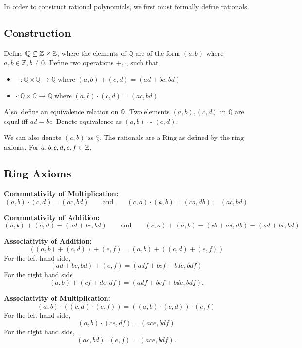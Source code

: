 In order to construct rational polynomials, we first must formally define rationals.
\subsection{Construction}

Define $\mathbb{Q} \subseteq \mathbb{Z}\times \mathbb{Z}$, where the elements of $\mathbb{Q}$ are of the form $(a,b)$ where $a,b\in\mathbb{Z}, b\neq 0$. Define two operations $+,\cdot$, such that 

\begin{itemize}
    \item $+:\mathbb{Q}\times \mathbb{Q}\rightarrow \mathbb{Q}$ where $(a,b)+(c,d)=(ad+bc,bd)$
    \item $\cdot:\mathbb{Q}\times \mathbb{Q}\rightarrow \mathbb{Q}$ where $(a,b)\cdot (c,d)=(ac,bd)$
\end{itemize}

Also, define an equivalence relation on $\mathbb{Q}$. Two elements $(a,b),(c,d)$ in $\mathbb{Q}$ are equal iff $ad=bc$. Denote equivalence as $(a,b)\sim(c,d)$.

We can also denote $(a,b)$ as $\frac{a}{b}$.
The rationals are a Ring as defined by the ring axioms. For $a, b, c, d, e, f\in \mathbb{Z}$, 
\subsection{Ring Axioms}
\textbf{Commutativity of Multiplication: } \[(a,b) \cdot (c,d) = (ac,bd) \qquad \text{and} \qquad (c,d) \cdot (a,b) = (ca, db) = (ac,bd)\]

\noindent\textbf{Commutativity of Addition: } \[(a,b)+(c,d) = (ad+bc, bd) \qquad \text{and} \qquad (c,d) + (a,b) = (cb+ad, db) = (ad+bc, bd)\]

\noindent\textbf{Associativity of Addition: } \[
((a,b) + (c,d))+(e,f) = (a,b)+((c,d)+(e,f))
\]
For the left hand side, \[   (ad+bc, bd)+(e,f) = (adf+bcf+bde, bdf)\]
For the right hand side \[(a,b) + (cf+de, df) = (adf+bcf+bde, bdf).\]



\noindent\textbf{Associativity of Multiplication: }
 \[(a,b)\cdot((c,d) \cdot(e,f)) = ((a,b) \cdot (c,d))\cdot(e,f)\]
\noindent
For the left hand side, \[(a,b)\cdot(ce,df)=(ace,bdf)\]
For the right hand side, 
\[
(ac,bd)\cdot(e,f)=(ace,bdf).
\]

